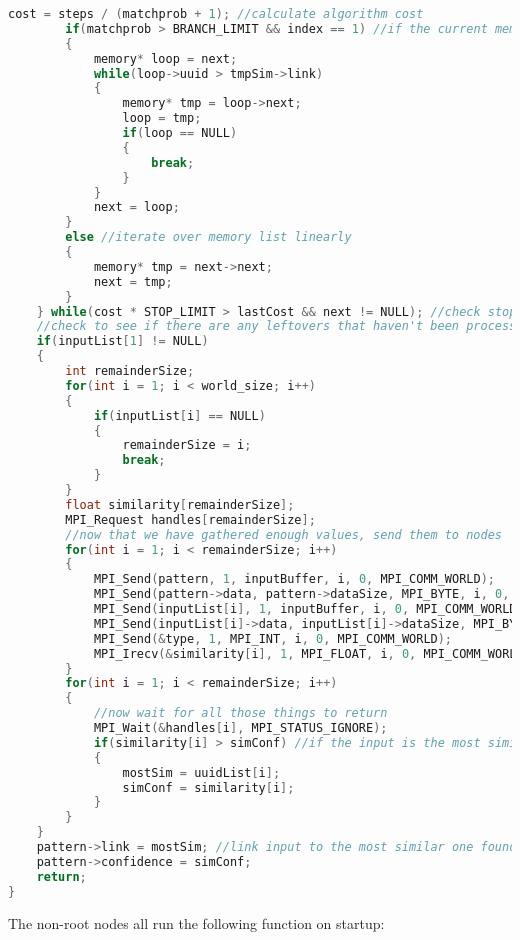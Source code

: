 \documentclass{report}
\begin{document}
\begin{lstlisting}[language=C]
        cost = steps / (matchprob + 1); //calculate algorithm cost
        if(matchprob > BRANCH_LIMIT && index == 1) //if the current memory is more similar than the BRANCH_LIMIT, go to the linked memory instead of iterating linearly
        {
            memory* loop = next;
            while(loop->uuid > tmpSim->link)
            {
                memory* tmp = loop->next;
                loop = tmp;
                if(loop == NULL)
                {
                    break;
                }
            }
            next = loop;
        }
        else //iterate over memory list linearly
        {
            memory* tmp = next->next;
            next = tmp;
        }
    } while(cost * STOP_LIMIT > lastCost && next != NULL); //check stop conditions
    //check to see if there are any leftovers that haven't been processed yet
    if(inputList[1] != NULL)
    {
        int remainderSize;
        for(int i = 1; i < world_size; i++)
        {
            if(inputList[i] == NULL)
            {
                remainderSize = i;
                break;
            }
        }
        float similarity[remainderSize];
        MPI_Request handles[remainderSize];
        //now that we have gathered enough values, send them to nodes
        for(int i = 1; i < remainderSize; i++)
        {
            MPI_Send(pattern, 1, inputBuffer, i, 0, MPI_COMM_WORLD);
            MPI_Send(pattern->data, pattern->dataSize, MPI_BYTE, i, 0, MPI_COMM_WORLD);
            MPI_Send(inputList[i], 1, inputBuffer, i, 0, MPI_COMM_WORLD);
            MPI_Send(inputList[i]->data, inputList[i]->dataSize, MPI_BYTE, i, 0, MPI_COMM_WORLD);
            MPI_Send(&type, 1, MPI_INT, i, 0, MPI_COMM_WORLD);
            MPI_Irecv(&similarity[i], 1, MPI_FLOAT, i, 0, MPI_COMM_WORLD, &handles[i]);
        }
        for(int i = 1; i < remainderSize; i++)
        {
            //now wait for all those things to return
            MPI_Wait(&handles[i], MPI_STATUS_IGNORE);
            if(similarity[i] > simConf) //if the input is the most similar of all inputs in the memory so far, save it
            {
                mostSim = uuidList[i];
                simConf = similarity[i];
            }
        }
    }
    pattern->link = mostSim; //link input to the most similar one found
    pattern->confidence = simConf;
    return;
}
\end{lstlisting}
The non-root nodes all run the following function on startup:
\lstset{style=ccode}
\end{document}
